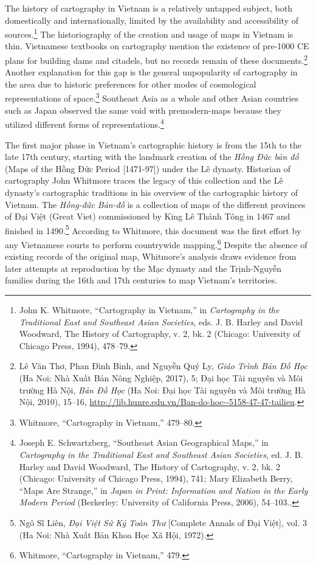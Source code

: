 The history of cartography in Vietnam is a relatively untapped subject, both domestically and internationally, limited by the availability and accessibility of sources.\footnote{John K. Whitmore, “Cartography in Vietnam,” in \textit{Cartography in the Traditional East and Southeast Asian Societies}, eds. J. B. Harley and David Woodward, The History of Cartography, v. 2, bk. 2 (Chicago: University of Chicago Press, 1994), 478–79.} The historiography of the creation and usage of maps in Vietnam is thin. Vietnamese textbooks on cartography mention the existence of pre-1000 CE plans for building dams and citadels, but no records remain of these documents.\footnote{\vi Lê Văn Thơ, Phan Đình Binh, and Nguyễn Quý Ly, \textit{Giáo Trình Bản Đồ Học} (Ha Noi: Nhà Xuất Bản Nông Nghiệp, 2017), 5; Đại học Tài nguyên và Môi trường Hà Nội, \textit{Bản Đồ Học} (Ha Noi: Đại học Tài nguyên và Môi trường Hà Nội, 2010), 15–16, \url{http://lib.hunre.edu.vn/Ban-do-hoc--5158-47-47-tailieu}.}  Another explanation for this gap is the general unpopularity of cartography in the area due to historic preferences for other modes of cosmological representations of space.\footnote{Whitmore, “Cartography in Vietnam,” 479–80.} Southeast Asia as a whole and other Asian countries such as Japan observed the same void with premodern-maps because they utilized different forms of representations.\footnote{Joseph E. Schwartzberg, “Southeast Asian Geographical Maps,” in \textit{Cartography in the Traditional East and Southeast Asian Societies}, ed. J. B. Harley and David Woodward, The History of Cartography, v. 2, bk. 2 (Chicago: University of Chicago Press, 1994), 741; Mary Elizabeth Berry, “Maps Are Strange,” in \textit{Japan in Print: Information and Nation in the Early Modern Period} (Berkerley: University of California Press, 2006), 54–103..}

The first major phase in Vietnam’s cartographic history is from the 15th to the late 17th century, starting with the landmark creation of the \vi \textit{Hồng Đức bản đồ} (Maps of the Hồng Đức Period [1471-97]) under the Lê dynasty. Historian of cartography John Whitmore traces the legacy of this collection and the Lê dynasty’s cartographic traditions in his overview of the cartographic history of Vietnam. The \textit{Hồng-đức Bản-đồ} is a collection of maps of the different provinces of Đại Việt (Great Viet) commissioned by King Lê Thánh Tông in 1467 and finished in 1490.\footnote{Ngô Sĩ Liên, \textit{Đại Việt Sử Ký Toàn Thư} [Complete Annals of Đại Việt], vol. 3 (Ha Noi: Nhà Xuất Bản Khoa Học Xã Hội, 1972).} According to Whitmore, this document was the first effort by any Vietnamese courts to perform countrywide mapping.\footnote{Whitmore, “Cartography in Vietnam,” 479.} Despite the absence of existing records of the original map, Whitmore’s analysis draws evidence from later attempts at reproduction by the Mạc dynasty and the Trịnh-Nguyễn families during the 16th and 17th centuries to map Vietnam’s territories. 

